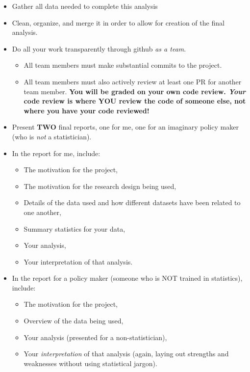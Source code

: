 \documentclass[12pt]{article}
\begin{document}
\begin{itemize}
  \item Gather all data needed to complete this analysis
  \item Clean, organize, and merge it in order to allow for creation of the final analysis.
  \item Do all your work transparently through github \emph{as a team}.
  \begin{itemize}
    \item All team members must make substantial commits to the project.
    \item All team members must also actively review at least one PR for another team member. \textbf{You will be graded on your own code review. \emph{Your} code review is where YOU review the code of someone else, not where you have your code reviewed!}
  \end{itemize}
  \item Present \textbf{TWO} final reports, one for me, one for an imaginary policy maker (who is \emph{not} a statistician).
  \item In the report for me, include:
  \begin{itemize}
    \item The motivation for the project,
    \item The motivation for the research design being used,
    \item Details of the data used and how different datasets have been related to one another,
    \item Summary statistics for your data,
    \item Your analysis,
    \item Your interpretation of that analysis.
  \end{itemize}
  \item In the report for a policy maker (someone who is NOT trained in statistics), include:
  \begin{itemize}
    \item The motivation for the project,
    \item Overview of the data being used,
    \item Your analysis (presented for a non-statistician),
    \item Your \emph{interpretation} of that analysis (again, laying out strengths and weaknesses without using statistical jargon).
  \end{itemize}
\end{itemize}
\end{document}
